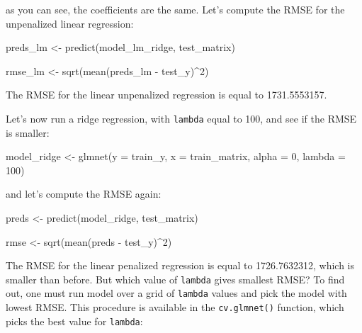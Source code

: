 \documentclass[
]{article}
\newenvironment{Shaded}{\begin{snugshade}}{\end{snugshade}}
\newcommand{\AttributeTok}[1]{\textcolor[rgb]{0.77,0.63,0.00}{#1}}
\newcommand{\DecValTok}[1]{\textcolor[rgb]{0.00,0.00,0.81}{#1}}
\newcommand{\FunctionTok}[1]{\textcolor[rgb]{0.00,0.00,0.00}{#1}}
\newcommand{\NormalTok}[1]{#1}
\newcommand{\OtherTok}[1]{\textcolor[rgb]{0.56,0.35,0.01}{#1}}
\newcommand{\SpecialCharTok}[1]{\textcolor[rgb]{0.00,0.00,0.00}{#1}}
\begin{document}
as you can see, the coefficients are the same. Let's compute the RMSE for the unpenalized linear
regression:

\begin{Shaded}
\begin{Highlighting}[]
\NormalTok{preds\_lm }\OtherTok{\textless{}{-}} \FunctionTok{predict}\NormalTok{(model\_lm\_ridge, test\_matrix)}

\NormalTok{rmse\_lm }\OtherTok{\textless{}{-}} \FunctionTok{sqrt}\NormalTok{(}\FunctionTok{mean}\NormalTok{(preds\_lm }\SpecialCharTok{{-}}\NormalTok{ test\_y)}\SpecialCharTok{\^{}}\DecValTok{2}\NormalTok{)}
\end{Highlighting}
\end{Shaded}

The RMSE for the linear unpenalized regression is equal to 1731.5553157.

Let's now run a ridge regression, with \texttt{lambda} equal to 100, and see if the RMSE is smaller:

\begin{Shaded}
\begin{Highlighting}[]
\NormalTok{model\_ridge }\OtherTok{\textless{}{-}} \FunctionTok{glmnet}\NormalTok{(}\AttributeTok{y =}\NormalTok{ train\_y, }\AttributeTok{x =}\NormalTok{ train\_matrix, }\AttributeTok{alpha =} \DecValTok{0}\NormalTok{, }\AttributeTok{lambda =} \DecValTok{100}\NormalTok{)}
\end{Highlighting}
\end{Shaded}

and let's compute the RMSE again:

\begin{Shaded}
\begin{Highlighting}[]
\NormalTok{preds }\OtherTok{\textless{}{-}} \FunctionTok{predict}\NormalTok{(model\_ridge, test\_matrix)}

\NormalTok{rmse }\OtherTok{\textless{}{-}} \FunctionTok{sqrt}\NormalTok{(}\FunctionTok{mean}\NormalTok{(preds }\SpecialCharTok{{-}}\NormalTok{ test\_y)}\SpecialCharTok{\^{}}\DecValTok{2}\NormalTok{)}
\end{Highlighting}
\end{Shaded}

The RMSE for the linear penalized regression is equal to 1726.7632312, which is smaller than before.
But which value of \texttt{lambda} gives smallest RMSE? To find out, one must run model over a grid of
\texttt{lambda} values and pick the model with lowest RMSE. This procedure is available in the \texttt{cv.glmnet()}
function, which picks the best value for \texttt{lambda}:
\end{document}

